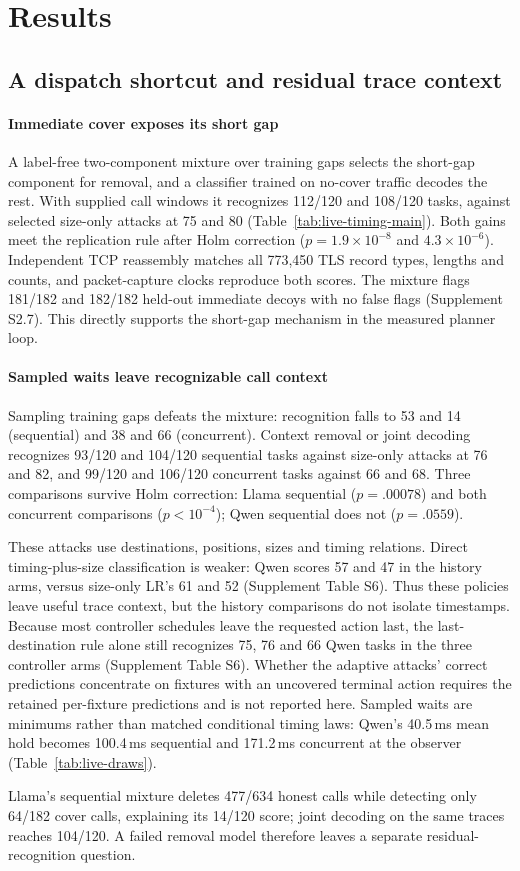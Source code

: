 \section{Results}\label{sec:results}
\subsection{A dispatch shortcut and residual trace context}\label{sec:dispatch}

\paragraph{Immediate cover exposes its short gap}
A label-free two-component mixture over training gaps selects the short-gap component for removal, and a classifier trained on no-cover traffic decodes the rest. With supplied call windows it recognizes 112/120 and 108/120 tasks, against selected size-only attacks at 75 and 80 (Table~\ref{tab:live-timing-main}). Both gains meet the replication rule after Holm correction ($p=1.9\times10^{-8}$ and $4.3\times10^{-6}$). Independent TCP reassembly matches all 773,450 TLS record types, lengths and counts, and packet-capture clocks reproduce both scores. The mixture flags 181/182 and 182/182 held-out immediate decoys with no false flags (Supplement S2.7). This directly supports the short-gap mechanism in the measured planner loop.

\paragraph{Sampled waits leave recognizable call context}
Sampling training gaps defeats the mixture: recognition falls to 53 and 14 (sequential) and 38 and 66 (concurrent). Context removal or joint decoding recognizes 93/120 and 104/120 sequential tasks against size-only attacks at 76 and 82, and 99/120 and 106/120 concurrent tasks against 66 and 68. Three comparisons survive Holm correction: Llama sequential ($p=.00078$) and both concurrent comparisons ($p<10^{-4}$); Qwen sequential does not ($p=.0559$).

These attacks use destinations, positions, sizes and timing relations. Direct timing-plus-size classification is weaker: Qwen scores 57 and 47 in the history arms, versus size-only LR's 61 and 52 (Supplement Table S6). Thus these policies leave useful trace context, but the history comparisons do not isolate timestamps. Because most controller schedules leave the requested action last, the last-destination rule alone still recognizes 75, 76 and 66 Qwen tasks in the three controller arms (Supplement Table S6). Whether the adaptive attacks' correct predictions concentrate on fixtures with an uncovered terminal action requires the retained per-fixture predictions and is not reported here. Sampled waits are minimums rather than matched conditional timing laws: Qwen's 40.5\,ms mean hold becomes 100.4\,ms sequential and 171.2\,ms concurrent at the observer (Table~\ref{tab:live-draws}).

Llama's sequential mixture deletes 477/634 honest calls while detecting only 64/182 cover calls, explaining its 14/120 score; joint decoding on the same traces reaches 104/120. A failed removal model therefore leaves a separate residual-recognition question.


